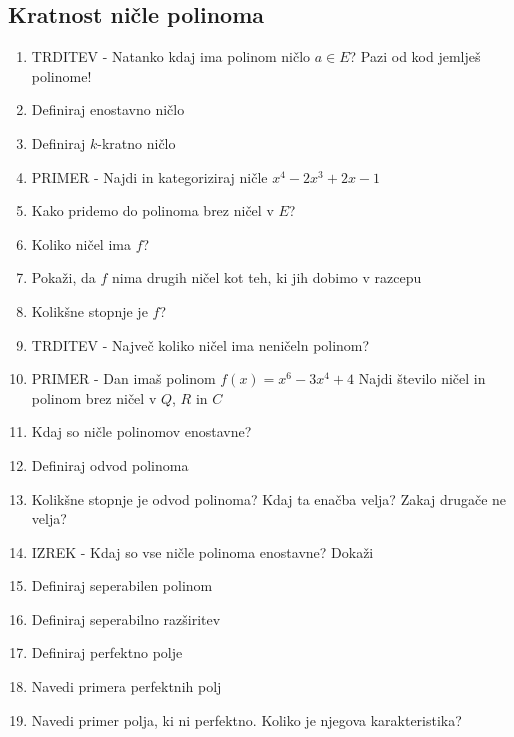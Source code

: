 \documentclass{article}
\begin{document}
    \subsection{Kratnost ničle polinoma}
    \begin{enumerate}
        \item TRDITEV - Natanko kdaj ima polinom ničlo $a \in E$? Pazi od kod jemlješ polinome!
        \item Definiraj enostavno ničlo
        \item Definiraj $k$-kratno ničlo
        \item PRIMER - Najdi in kategoriziraj ničle $x^4 - 2x^3 + 2x - 1$
        \item Kako pridemo do polinoma brez ničel v $E$?
        \item Koliko ničel ima $f$?
        \item Pokaži, da $f$ nima drugih ničel kot teh, ki jih dobimo v razcepu
        \item Kolikšne stopnje je $f$?
        \item TRDITEV - Največ koliko ničel ima neničeln polinom?
        \item PRIMER - Dan imaš polinom $f(x) = x^6 - 3x^4 + 4$ Najdi število ničel in polinom brez ničel v $Q$, $R$ in $C$
        \item Kdaj so ničle polinomov enostavne?
        \item Definiraj odvod polinoma
        \item Kolikšne stopnje je odvod polinoma? Kdaj ta enačba velja? Zakaj drugače ne velja?
        \item IZREK - Kdaj so vse ničle polinoma enostavne? Dokaži
        \item Definiraj seperabilen polinom 
        \item Definiraj seperabilno razširitev
        \item Definiraj perfektno polje
        \item Navedi primera perfektnih polj
        \item Navedi primer polja, ki ni perfektno. Koliko je njegova karakteristika?
    \end{enumerate}
\end{document}
